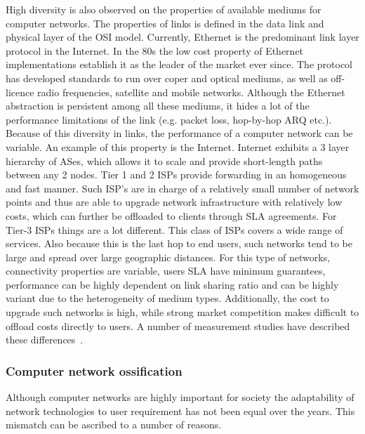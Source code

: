 High diversity is also observed on the properties of available mediums for
computer networks. The properties of links is defined in the data link and
physical layer of the OSI model. Currently, Ethernet is the predominant link
layer protocol in the Internet. In the 80s the low cost property of Ethernet
implementations establish it as the leader of the market ever since.  The
protocol has developed standards to run over coper and optical mediums, as well
as off-licence radio frequencies, satellite and mobile networks. Although the
Ethernet abstraction is persistent among all these mediums, it hides a lot of
the performance limitations of the link (e.g. packet loss, hop-by-hop ARQ etc.).
Because of this diversity in links, the performance of a computer network can be
variable. An example of this property is the Internet. Internet exhibits a 3
layer hierarchy of ASes, which allows it to scale and provide short-length paths
between any 2 nodes.  Tier 1 and 2 ISPs provide forwarding in an homogeneous and
fast manner. Such ISP's are in charge of a relatively small number of network
points and thus are able to upgrade network infrastructure with relatively low costs,
which can further be offloaded to clients through SLA agreements. For Tier-3 ISPs things
are a lot different. This class of ISPs covers a wide range of services. Also
because this is the last hop to end users, such networks tend to be large and
spread over large geographic distances. For this type of networks, connectivity
properties are variable, users SLA have minimum guarantees, performance can be
highly dependent on link sharing ratio and can be highly variant
due to the heterogeneity of medium types. Additionally, the cost to upgrade such
networks is high, while strong market competition makes difficult to offload
costs directly to users. A number of measurement studies have
described these differences~\cite{Huang:2010wb,Dischinger:2007bg}. 

\subsubsection*{Computer network ossification}

Although computer networks are highly important for society the adaptability of
network technologies to user requirement has not been equal over the years. This
mismatch can be ascribed to a number of reasons. 

